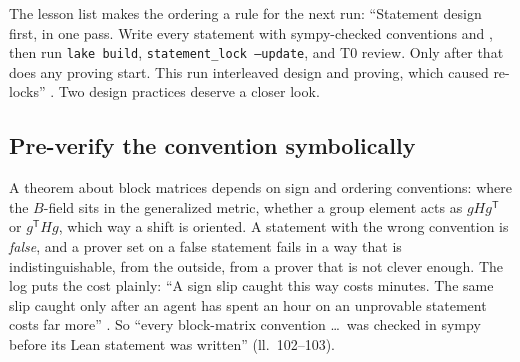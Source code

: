 The lesson list makes the ordering a rule for the next run: ``Statement design first, in one
pass. Write every statement with sympy-checked conventions and , then run
\texttt{lake build}, \texttt{statement\_lock --update}, and T0 review. Only after that does any
proving start. This run interleaved design and proving, which caused re-locks''
. Two design practices deserve a closer look.

\subsection{Pre-verify the convention symbolically}\label{sec:pipeline:sympy}

A theorem about block matrices depends on sign and ordering conventions: where the $B$-field
sits in the generalized metric, whether a group element acts as $gHg^{\mathsf T}$ or
$g^{\mathsf T}Hg$, which way a shift is oriented. A statement with the wrong convention is
\emph{false}, and a prover set on a false statement fails in a way that is
indistinguishable, from the outside, from a prover that is not clever enough. The log puts
the cost plainly: ``A sign slip caught this way costs minutes. The same slip caught only
after an agent has spent an hour on an unprovable statement costs far more''
. So ``every block-matrix convention \ldots\ was checked
in sympy before its Lean statement was written'' (ll.~102--103).

